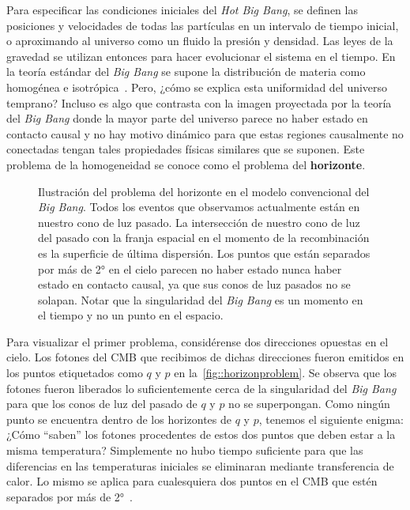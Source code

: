 Para especificar las condiciones iniciales del \textit{Hot Big Bang}, se definen las posiciones y velocidades de todas las partículas en un intervalo de tiempo inicial, o aproximando al universo como un fluido la presión y densidad. Las leyes de la gravedad se utilizan entonces para hacer evolucionar el sistema en el tiempo. En la teoría estándar del \textit{Big Bang} se supone la distribución de materia como homogénea e isotrópica~\cite{baumann2022cosmology}. Pero, ¿cómo se explica esta uniformidad del universo temprano? Incluso es algo que contrasta con la imagen proyectada por la teoría del \textit{Big Bang} donde la mayor parte del universo parece no haber estado en contacto causal y no hay motivo dinámico para que estas regiones causalmente no conectadas tengan tales propiedades físicas similares que se suponen. Este problema de la homogeneidad se conoce como el problema del \textbf{horizonte}.

\begin{figure}[t]
    \centering
    \def\svgwidth{0.75\textwidth}
    
    \caption[Ilustración del problema del horizonte]{Ilustración del problema del horizonte en el modelo convencional del \textit{Big Bang}. Todos los eventos que observamos actualmente están en nuestro cono de luz pasado. La intersección de nuestro cono de luz del pasado con la franja espacial en el momento de la recombinación es la superficie de última dispersión. Los puntos que están separados por más de 2° en el cielo parecen no haber estado nunca haber estado en contacto causal, ya que sus conos de luz pasados no se solapan. Notar que la singularidad del \textit{Big Bang} es un momento en el tiempo y no un punto en el espacio.}
    \label{fig::horizonproblem}
\end{figure}
Para visualizar el primer problema, considérense dos direcciones opuestas en el cielo. Los fotones del CMB que recibimos de dichas direcciones fueron emitidos en los puntos etiquetados como \(q\) y \(p\) en la~\autoref{fig::horizonproblem}. Se observa que los fotones fueron liberados lo suficientemente cerca de la singularidad del \textit{Big Bang} para que los conos de luz del pasado de \(q\) y \(p\) no se superpongan. Como ningún punto se encuentra dentro de los horizontes de \(q\) y \(p\), tenemos el siguiente enigma: ¿Cómo ``saben'' los fotones procedentes de estos dos puntos que deben estar a la misma temperatura? Simplemente no hubo tiempo suficiente para que las diferencias en las temperaturas iniciales se eliminaran mediante transferencia de calor. Lo mismo se aplica para cualesquiera dos puntos en el CMB que estén separados por más de 2°~\cite{baumann2022cosmology}.

